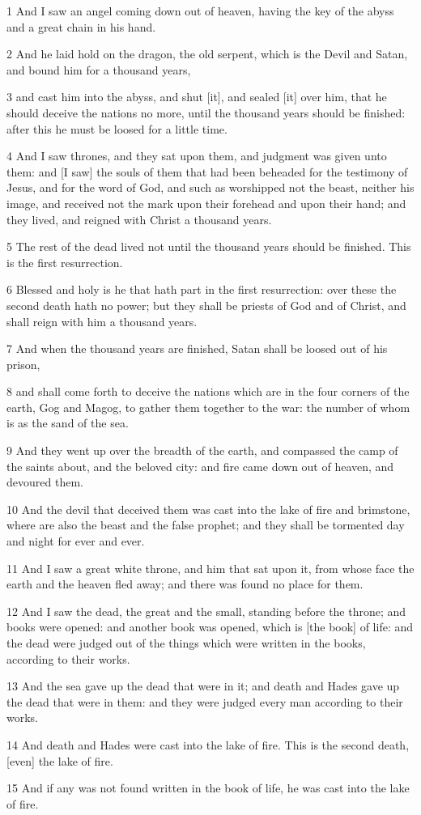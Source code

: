 \par 1 And I saw an angel coming down out of heaven, having the key of the abyss and a great chain in his hand.
\par 2 And he laid hold on the dragon, the old serpent, which is the Devil and Satan, and bound him for a thousand years,
\par 3 and cast him into the abyss, and shut [it], and sealed [it] over him, that he should deceive the nations no more, until the thousand years should be finished: after this he must be loosed for a little time.
\par 4 And I saw thrones, and they sat upon them, and judgment was given unto them: and [I saw] the souls of them that had been beheaded for the testimony of Jesus, and for the word of God, and such as worshipped not the beast, neither his image, and received not the mark upon their forehead and upon their hand; and they lived, and reigned with Christ a thousand years.
\par 5 The rest of the dead lived not until the thousand years should be finished. This is the first resurrection.
\par 6 Blessed and holy is he that hath part in the first resurrection: over these the second death hath no power; but they shall be priests of God and of Christ, and shall reign with him a thousand years.
\par 7 And when the thousand years are finished, Satan shall be loosed out of his prison,
\par 8 and shall come forth to deceive the nations which are in the four corners of the earth, Gog and Magog, to gather them together to the war: the number of whom is as the sand of the sea.
\par 9 And they went up over the breadth of the earth, and compassed the camp of the saints about, and the beloved city: and fire came down out of heaven, and devoured them.
\par 10 And the devil that deceived them was cast into the lake of fire and brimstone, where are also the beast and the false prophet; and they shall be tormented day and night for ever and ever.
\par 11 And I saw a great white throne, and him that sat upon it, from whose face the earth and the heaven fled away; and there was found no place for them.
\par 12 And I saw the dead, the great and the small, standing before the throne; and books were opened: and another book was opened, which is [the book] of life: and the dead were judged out of the things which were written in the books, according to their works.
\par 13 And the sea gave up the dead that were in it; and death and Hades gave up the dead that were in them: and they were judged every man according to their works.
\par 14 And death and Hades were cast into the lake of fire. This is the second death, [even] the lake of fire.
\par 15 And if any was not found written in the book of life, he was cast into the lake of fire.

